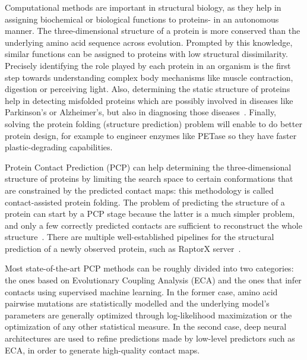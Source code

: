     Computational methods are important in structural biology,
    as they help in assigning biochemical or biological functions to proteins-
    in an autonomous manner.
    The three-dimensional structure of a protein is more conserved than the
    underlying amino acid sequence across evolution.
    Prompted by this knowledge, similar functions
    can be assigned to proteins with low structural dissimilarity.
    Precisely identifying the role played by each protein in an organism is the first step
    towards understanding complex body mechanisms like muscle contraction, digestion or perceiving light.
    Also, determining the static structure of proteins help in detecting misfolded proteins
    which are possibly involved in diseases like Parkinson's or
    Alzheimer's, but also in diagnosing those diseases~\cite{forloni2002protein}.
    Finally, solving the protein folding (structure prediction) problem will enable
    to do better protein design, for example to engineer enzymes like PETase
    so they have faster plastic-degrading capabilities.

    Protein Contact Prediction (PCP) can help determining the three-dimensional structure of
    proteins by limiting the search space to certain conformations that are
    constrained by the predicted contact maps: this methodology is called contact-assisted protein folding.
    The problem of predicting the structure of a protein can start by a PCP stage because the latter is a much simpler problem,
    and only a few correctly predicted contacts are sufficient to reconstruct the whole structure~\cite{kim2014one}.
    There are multiple well-established pipelines for the structural prediction of a newly
    observed protein, such as RaptorX server~\cite{peng2011raptorx}.

    Most state-of-the-art PCP methods can be roughly divided into two categories:
    the ones based on Evolutionary Coupling Analysis (ECA) and the ones that infer contacts using
    supervised machine learning. In the former case, amino acid pairwise mutations
    are statistically modelled and the underlying model's parameters
    are generally optimized through log-likelihood maximization or the optimization of any other statistical measure.
    In the second case, deep neural architectures are used to
    refine predictions made by low-level predictors such as ECA, in order to generate high-quality contact maps.

